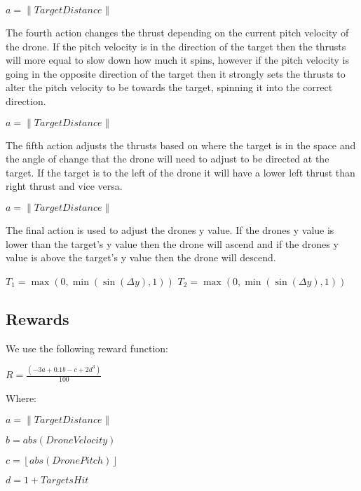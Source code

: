 \begingroup\centering
$a=\left \| Target Distance \right \|$

\endgroup

The fourth action changes the thrust depending on the current pitch velocity of the drone. If the pitch velocity is in the direction of the target then the thrusts will more equal to slow down how much it spins, however if the pitch velocity is going in the opposite direction of the target then it strongly sets the thrusts to alter the pitch velocity to be towards the target, spinning it into the correct direction.

\begingroup\centering
$a=\left \| Target Distance \right \|$

\endgroup

The fifth action adjusts the thrusts based on where the target is in the space and the angle of change that the drone will need to adjust to be directed at the target. If the target is to the left of the drone it will have a lower left thrust than right thrust and vice versa. 

\begingroup\centering
$a=\left \| Target Distance \right \|$

\endgroup

The final action is used to adjust the drones y value. If the drones y value is lower than the target's y value then the drone will ascend and if the drones y value is above the target's y value then the drone will descend. 

\begingroup\centering
$T_1 =  \max (0,\min (\sin(\Delta y),1))$
$T_2 =  \max (0,\min (\sin(\Delta y),1))$

\endgroup

\subsection{Rewards}
We use the following reward function:

\begingroup\centering

$R=\frac{(-3a+0.1b-c+2d^3)}{100}$

\endgroup

Where:

\begingroup\centering
$a=\left \| Target Distance \right \|$

$b=abs(Drone Velocity)$

$c= \left \lfloor abs(DronePitch)  \right \rfloor $

$d=1+TargetsHit$

\endgroup
